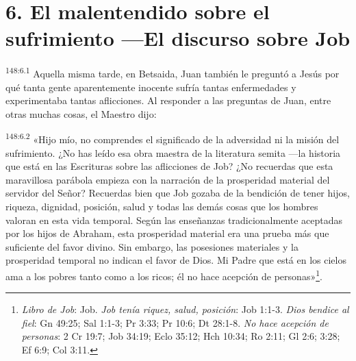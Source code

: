 \section*{6. El malentendido sobre el sufrimiento ---El discurso sobre Job}
\par
\textsuperscript{148:6.1} Aquella misma tarde, en Betsaida, Juan también le preguntó a Jesús por qué tanta gente aparentemente inocente sufría tantas enfermedades y experimentaba tantas aflicciones. Al responder a las preguntas de Juan, entre otras muchas cosas, el Maestro dijo:

\par
\textsuperscript{148:6.2} «Hijo mío, no comprendes el significado de la adversidad ni la misión del sufrimiento. ¿No has leído esa obra maestra de la literatura semita ---la historia que está en las Escrituras sobre las aflicciones de Job? ¿No recuerdas que esta maravillosa parábola empieza con la narración de la prosperidad material del servidor del Señor? Recuerdas bien que Job gozaba de la bendición de tener hijos, riqueza, dignidad, posición, salud y todas las demás cosas que los hombres valoran en esta vida temporal. Según las enseñanzas tradicionalmente aceptadas por los hijos de Abraham, esta prosperidad material era una prueba más que suficiente del favor divino. Sin embargo, las posesiones materiales y la prosperidad temporal no indican el favor de Dios. Mi Padre que está en los cielos ama a los pobres tanto como a los ricos; él no hace acepción de personas»\footnote{\textit{Libro de Job}: Job. \textit{Job tenía riquez, salud, posición}: Job 1:1-3. \textit{Dios bendice al fiel}: Gn 49:25; Sal 1:1-3; Pr 3:33; Pr 10:6; Dt 28:1-8. \textit{No hace acepción de personas}: 2 Cr 19:7; Job 34:19; Eclo 35:12; Hch 10:34; Ro 2:11; Gl 2:6; 3:28; Ef 6:9; Col 3:11.}.

